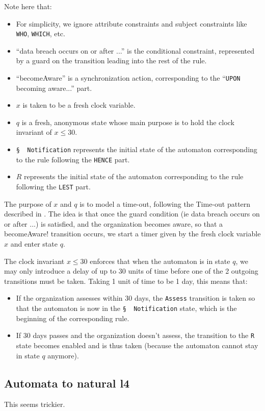 Note here that:
\begin{itemize}
  \item For simplicity, we ignore attribute constraints and subject constraints
  like \texttt{WHO}, \texttt{WHICH}, etc.

  \item ``data breach occurs on or after ...'' is the conditional constraint,
  represented by a guard on the transition leading into the rest of the rule.

  \item ``becomeAware'' is a synchronization action, corresponding to the
  ``\texttt{UPON} becoming aware...'' part.

  \item $x$ is taken to be a fresh clock variable.

  \item $q$ is a fresh, anonymous state whose main purpose is to hold the clock
  invariant of $x \leq 30$.

  \item \texttt{\S \, Notification} represents the initial state of the
  automaton corresponding to the rule following the \texttt{HENCE} part.

  \item $R$ represents the initial state of the automaton corresponding to the
  rule following the \texttt{LEST} part.
\end{itemize}

The purpose of $x$ and $q$ is to model a time-out, following the
Time-out pattern described in
\cite[Definition 12]{sunjun_2008_timed_automata_patterns}.
The idea is that once the guard condition
(ie data breach occurs on or after ...) is satisfied,
and the organization becomes aware, so that a becomeAware! transition occurs,
we start a timer given by the fresh clock variable $x$ and enter state $q$.

The clock invariant $x \leq 30$ enforces that when the automaton is in state
$q$, we may only introduce a delay of up to 30 units of time before one of
the 2 outgoing transitions must be taken.
Taking 1 unit of time to be 1 day, this means that:
\begin{itemize}
  \item If the organization assesses within 30 days, the \texttt{Assess}
  transition is taken so that the automaton is now in the
  \texttt{\S \, Notification} state, which is the beginning of the
  corresponding rule. 

  \item If 30 days passes and the organization doesn't assess, the transition
  to the \texttt{R} state becomes enabled and is thus taken (because the
  automaton cannot stay in state $q$ anymore).
\end{itemize}

\subsection{Automata to natural l4}
This seems trickier.